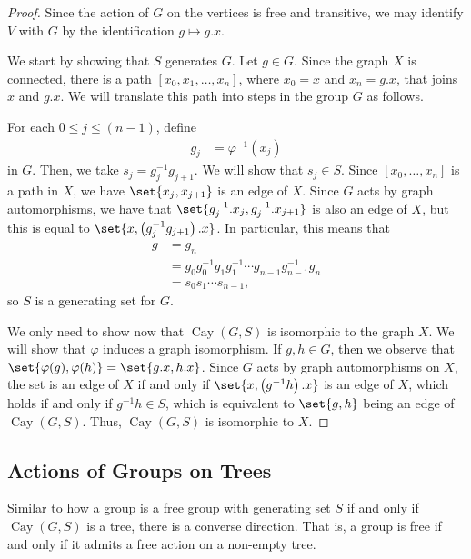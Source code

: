 \documentclass[10pt]{mypackage}
\begin{document}
\begin{proof}
  Since the action of $G$ on the vertices is free and transitive, we may identify $V$ with $G$ by the identification $g\mapsto g.x$.

  We start by showing that $S$ generates $G$. Let $g\in G$. Since the graph $X$ is connected, there is a path $\left[ x_0,x_1,\dots,x_n \right]$, where $x_0 = x$ and $x_n = g.x$, that joins $x$ and $g.x$. We will translate this path into steps in the group $G$ as follows.

  For each $0\leq j \leq \left( n-1 \right)$, define
  \begin{align*}
    g_j &= \varphi^{-1}\left( x_j \right)
  \end{align*}
  in $G$. Then, we take $s_j = g_j^{-1}g_{j+1}$. We will show that $s_j\in S$. Since $\left[ x_0,\dots,x_n \right]$ is a path in $X$, we have $\set{x_j,x_{j+1}}$ is an edge of $X$. Since $G$ acts by graph automorphisms, we have that $\set{g_j^{-1}.x_j,g_j^{-1}.x_{j+1}}$ is also an edge of $X$, but this is equal to $\set{x,\left( g_j^{-1}g_{j+1} \right).x}$. In particular, this means that
  \begin{align*}
    g &= g_n\\
      &= g_0g_0^{-1}g_1g_1^{-1}\cdots g_{n-1}g_{n-1}^{-1}g_n\\
      &= s_0s_1\cdots s_{n-1},
  \end{align*}
  so $S$ is a generating set for $G$.

  We only need to show now that $\operatorname{Cay}\left( G,S \right)$ is isomorphic to the graph $X$. We will show that $\varphi$ induces a graph isomorphism. If $g,h\in G$, then we observe that $\set{\varphi(g),\varphi(h)} = \set{g.x, h.x}$. Since $G$ acts by graph automorphisms on $X$, the set is an edge of $X$ if and only if $\set{x,\left( g^{-1}h \right).x}$ is an edge of $X$, which holds if and only if $g^{-1}h\in S$, which is equivalent to $\set{g,h}$ being an edge of $\operatorname{Cay}\left( G,S \right)$. Thus, $ \operatorname{Cay}\left( G,S \right) $ is isomorphic to $X$.
\end{proof}

\subsection{Actions of Groups on Trees}%
Similar to how a group is a free group with generating set $S$ if and only if $\operatorname{Cay}\left( G,S \right)$ is a tree, there is a converse direction. That is, a group is free if and only if it admits a free action on a non-empty tree.
\end{document}

